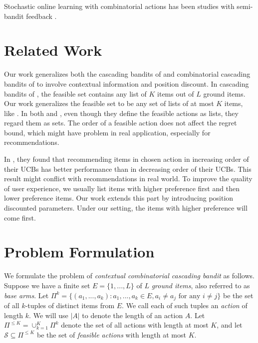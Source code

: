 \documentclass{article}
\newcommand{\cS}{\mathcal{S}}
\begin{document}
Stochastic online learning with combinatorial actions has been studies with semi-bandit feedback \cite{chen2013combinatorial}.

\section{Related Work}

Our work generalizes both the cascading bandits of \cite{kveton2015cascading} and combinatorial cascading bandits of \cite{kveton2015combinatorial} to involve contextual information and position discount. In cascading bandits of \cite{kveton2015cascading}, the feasible set contains any list of $K$ items out of $L$ ground items. Our work generalizes the feasible set to be any set of lists of at most $K$ items, like \cite{kveton2015combinatorial}. In both \cite{kveton2015cascading} and \cite{kveton2015combinatorial}, even though they define the feasible actions as lists, they regard them as sets. The order of a feasible action does not affect the regret bound, which might have problem in real application, especially for recommendations.

In \cite{kveton2015cascading}, they found that recommending items in chosen action in increasing order of their UCBs has better performance than in decreasing order of their UCBs.
This result might conflict with recommendations in real world.
To improve the quality of user experience, we usually list items with higher preference first and then lower preference items.
Our work extends this part by introducing position discounted parameters.
Under our setting, the items with higher preference will come first.
	
\section{Problem Formulation}

We formulate the problem of {\em contextual combinatorial cascading bandit} as follows. 
Suppose we have a finite set  $E=\{1,...,L\}$ of $L$ \textit{ground items},  also referred to as {\em base arms}. 
Let $\Pi^k=\{(a_1,...,a_k): a_1,...,a_k \in E, a_i \neq a_j \text{ for any } i \neq j\}$ be the set of all $k$-tuples of distinct items from $E$. 
We call each of such tuples an {\em action} of length $k$. We will use $|A|$ to denote the length of an action $A$.
Let $\Pi^{\leq K}= \cup_{k=1}^K \Pi^{k}$ denote the set of all actions with length at most $K$, and let $\cS \subseteq \Pi^{\leq K}$ be the set of \textit{feasible actions} with length at most $K$. 
\end{document}

